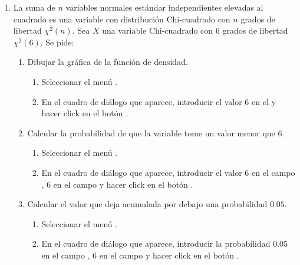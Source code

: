 \begin{enumerate}[leftmargin=*]
\item La suma de $n$ variables normales estándar independientes elevadas al cuadrado es una variable con distribución Chi-cuadrado con $n$
grados de libertad $\chi^2(n)$. 
Sea $X$ una variable Chi-cuadrado con 6 grados de libertad $\chi^2(6)$. 
Se pide:
\begin{enumerate}
\item Dibujar la gráfica de la función de densidad. 
\begin{indicacion}{
\begin{enumerate}
\item Seleccionar el menú .
\item En el cuadro de diálogo que aparece, introducir el valor 6 en el  y hacer click en el
botón .
\end{enumerate}}
\end{indicacion}

\item Calcular la probabilidad de que la variable tome un valor menor que 6.
\begin{indicacion}{
\begin{enumerate}
\item Seleccionar el menú .
\item En el cuadro de diálogo que aparece, introducir el valor $6$ en el campo , 6 en
el campo  y hacer click en el botón .
\end{enumerate}}
\end{indicacion}

\item Calcular el valor que deja acumulada por debajo una probabilidad $0.05$.
\begin{indicacion}{
\begin{enumerate}
\item Seleccionar el menú .
\item En el cuadro de diálogo que aparece, introducir la probabilidad 0.05 en el campo , 6 en
el campo  y hacer click en el botón .
\end{enumerate}}
\end{indicacion}


\end{enumerate}
\end{enumerate}

